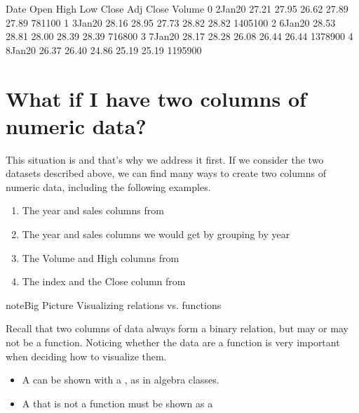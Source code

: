 \documentclass[letterpaper,10pt,english]{sphinxmanual}
\begin{document}
\begin{sphinxVerbatim}[commandchars=\\\{\}]
       Date   Open   High    Low  Close  Adj Close   Volume
0  2\PYGZhy{}Jan\PYGZhy{}20  27.21  27.95  26.62  27.89      27.89   781100
1  3\PYGZhy{}Jan\PYGZhy{}20  28.16  28.95  27.73  28.82      28.82  1405100
2  6\PYGZhy{}Jan\PYGZhy{}20  28.53  28.81  28.00  28.39      28.39   716800
3  7\PYGZhy{}Jan\PYGZhy{}20  28.17  28.28  26.08  26.44      26.44  1378900
4  8\PYGZhy{}Jan\PYGZhy{}20  26.37  26.40  24.86  25.19      25.19  1195900
\end{sphinxVerbatim}


\section{What if I have two columns of numeric data?}
\label{\detokenize{chapter-10-visualization:what-if-i-have-two-columns-of-numeric-data}}
This situation is  and that’s why we address it first.  If we consider the two datasets described above, we can find many ways to create two columns of numeric data, including the following examples.
\begin{enumerate}
%
\item {} 
The year and sales columns from 

\item {} 
The year and sales columns we would get by grouping  by year

\item {} 
The Volume and High columns from 

\item {} 
The index and the Close column from 

\end{enumerate}

\begin{sphinxadmonition}{note}{Big Picture \sphinxhyphen{} Visualizing relations vs. functions}

Recall that two columns of data always form a binary relation, but may or may not be a function.  Noticing whether the data are a function is very important when deciding how to visualize them.
\begin{itemize}
\item {} 
A  can be shown with a , as in algebra classes.

\item {} 
A  that is not a function must be shown as a 

\end{itemize}
\end{sphinxadmonition}
\end{document}
